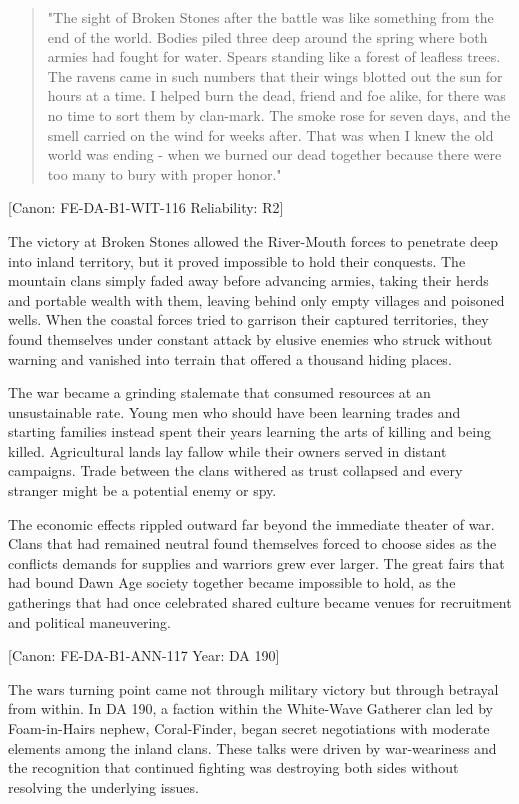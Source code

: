 \begin{quote}
"The sight of Broken Stones after the battle was like something from the
end of the world. Bodies piled three deep around the spring where both
armies had fought for water. Spears standing like a forest of leafless
trees. The ravens came in such numbers that their wings blotted out the
sun for hours at a time. I helped burn the dead, friend and foe alike,
for there was no time to sort them by clan-mark. The smoke rose for
seven days, and the smell carried on the wind for weeks after. That was
when I knew the old world was ending - when we burned our dead together
because there were too many to bury with proper honor."
\end{quote}

{[}Canon: FE-DA-B1-WIT-116 \textbar{} Reliability: R2{]}

The victory at Broken Stones allowed the River-Mouth forces to penetrate
deep into inland territory, but it proved impossible to hold their
conquests. The mountain clans simply faded away before advancing armies,
taking their herds and portable wealth with them, leaving behind only
empty villages and poisoned wells. When the coastal forces tried to
garrison their captured territories, they found themselves under
constant attack by elusive enemies who struck without warning and
vanished into terrain that offered a thousand hiding places.

The war became a grinding stalemate that consumed resources at an
unsustainable rate. Young men who should have been learning trades and
starting families instead spent their years learning the arts of killing
and being killed. Agricultural lands lay fallow while their owners
served in distant campaigns. Trade between the clans withered as trust
collapsed and every stranger might be a potential enemy or spy.

The economic effects rippled outward far beyond the immediate theater of
war. Clans that had remained neutral found themselves forced to choose
sides as the conflict\textquotesingle s demands for supplies and
warriors grew ever larger. The great fairs that had bound Dawn Age
society together became impossible to hold, as the gatherings that had
once celebrated shared culture became venues for recruitment and
political maneuvering.

{[}Canon: FE-DA-B1-ANN-117 \textbar{} Year: DA 190{]}

The war\textquotesingle s turning point came not through military
victory but through betrayal from within. In DA 190, a faction within
the White-Wave Gatherer clan led by Foam-in-Hair\textquotesingle s
nephew, Coral-Finder, began secret negotiations with moderate elements
among the inland clans. These talks were driven by war-weariness and the
recognition that continued fighting was destroying both sides without
resolving the underlying issues.

